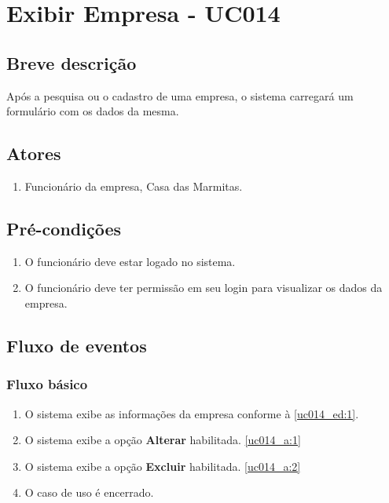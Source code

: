 \chapter{Exibir Empresa - UC014} \label{uc014}

\section{Breve descrição}

Após a pesquisa ou o cadastro de uma empresa, o sistema carregará um formulário com os dados da mesma.

\section{Atores}

\begin{enumerate}
	\item Funcionário da empresa, Casa das Marmitas.
\end{enumerate}

\section{Pré-condições}

\begin{enumerate}
	\item O funcionário deve estar logado no sistema.
	\item O funcionário deve ter permissão em seu login para visualizar os dados da empresa.
\end{enumerate}

\section{Fluxo de eventos}

\subsection{Fluxo básico}

\begin{enumerate}[label=P\arabic*]
	\item O sistema exibe as informações da empresa conforme à \ref{uc014_ed:1}. \label{uc014_p:1}
	\item O sistema exibe a opção \textbf{Alterar} habilitada.\label{uc014_p:2} \ref{uc014_a:1} 
	\item O sistema exibe a opção \textbf{Excluir} habilitada.\label{uc014_p:3} \ref{uc014_a:2}
	\item O caso de uso é encerrado.
\end{enumerate}

